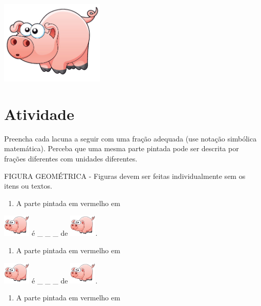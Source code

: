 \documentclass[a4,12pt]{book}
\begin{document}
\includegraphics[width=\textwidth,height=4cm, keepaspectratio]{pig}
\section{Atividade}







Preencha cada lacuna a seguir com uma fração adequada (use notação simbólica matemática). Perceba que uma mesma parte pintada pode ser descrita por frações diferentes com unidades diferentes.
\begin{imagem*}[breakable]{}{}   FIGURA GEOMÉTRICA - Figuras devem ser feitas individualmente sem os itens ou textos.
\end{imagem*}
\begin{enumerate} [\quad a)] %
  \item     A parte pintada em vermelho em
\end{enumerate} %
\includegraphics[height=30pt, keepaspectratio]{pig} é \_ \_ \_   de \includegraphics[height=30pt, keepaspectratio]{pig}.
\begin{enumerate} [\quad a)] %
  \item     A parte pintada em vermelho em
\end{enumerate} %
\includegraphics[height=30pt, keepaspectratio]{pig} é \_ \_ \_   de \includegraphics[height=30pt, keepaspectratio]{pig}.
\begin{enumerate} [\quad a)] %
  \item     A parte pintada em vermelho em
\end{enumerate} %
\end{document}
